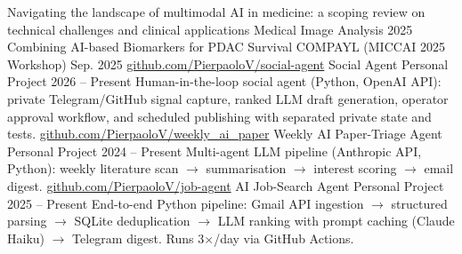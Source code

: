 \begin{cventries}
    \cventry
        {}
        {Navigating the landscape of multimodal AI in medicine: a scoping review on technical challenges and clinical applications}
        {Medical Image Analysis}
        {2025}
        {}
    \vspace{1mm}
    \cventry
        {}
        {Combining AI-based Biomarkers for PDAC Survival}
        {COMPAYL (MICCAI 2025 Workshop)}
        {Sep. 2025}
        {}
    \vspace{1mm}
    \cventry
        {\href{https://github.com/PierpaoloV/social-agent}{github.com/PierpaoloV/social-agent}}
        {Social Agent}
        {Personal Project}
        {2026 -- Present}
        {Human-in-the-loop social agent (Python, OpenAI API): private Telegram/GitHub signal capture, ranked LLM draft generation, operator approval workflow, and scheduled publishing with separated private state and tests.}
    \vspace{1mm}
    \cventry
        {\href{https://github.com/PierpaoloV/weekly\_ai\_paper}{github.com/PierpaoloV/weekly\_ai\_paper}}
        {Weekly AI Paper-Triage Agent}
        {Personal Project}
        {2024 -- Present}
        {Multi-agent LLM pipeline (Anthropic API, Python): weekly literature scan $\rightarrow$ summarisation $\rightarrow$ interest scoring $\rightarrow$ email digest.}
    \vspace{1mm}
    \cventry
        {\href{https://github.com/PierpaoloV/job-agent}{github.com/PierpaoloV/job-agent}}
        {AI Job-Search Agent}
        {Personal Project}
        {2025 -- Present}
        {End-to-end Python pipeline: Gmail API ingestion $\rightarrow$ structured parsing $\rightarrow$ SQLite deduplication $\rightarrow$ LLM ranking with prompt caching (Claude Haiku) $\rightarrow$ Telegram digest. Runs 3$\times$/day via GitHub Actions.}

\end{cventries}
